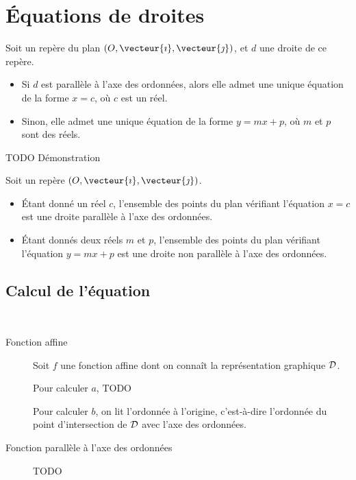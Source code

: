 \section{Équations de droites}

\begin{propriete}
  Soit un repère du plan $(O, \vecteur{\imath}, \vecteur{\jmath})$, et $d$
  une droite de ce repère.

  \begin{itemize}
    \item Si $d$ est parallèle à l'axe des ordonnées, alors elle admet une
      unique équation de la forme $x=c$, où $c$ est un réel.
    \item Sinon, elle admet une unique équation de la forme $y=mx+p$, où $m$ et
      $p$ sont des réels.
  \end{itemize}
\end{propriete}
TODO Démonstration

\begin{propriete}[Réciproque]
  Soit un repère $(O, \vecteur{\imath}, \vecteur{\jmath})$.
  \begin{itemize}
    \item Étant donné un réel $c$, l'ensemble des points du plan
      vérifiant l'équation $x=c$ est une droite parallèle à l'axe des
      ordonnées.
    \item Étant donnés deux réels $m$ et $p$, l'ensemble des points du plan
      vérifiant l'équation $y=mx+p$ est une droite non parallèle à l'axe des
      ordonnées.
  \end{itemize}
\end{propriete}

\subsection{Calcul de l'équation}

\begin{methode}~
  \begin{description}
    \item[Fonction affine] Soit $f$ une fonction affine dont on connaît la représentation graphique $\cal D$.

      Pour calculer $a$, TODO

      Pour calculer $b$, on lit l'ordonnée à l'origine, c'est-à-dire l'ordonnée
      du point d'intersection de $\cal D$ avec l'axe des ordonnées.
    \item[Fonction parallèle à l'axe des ordonnées] TODO
  \end{description}
\end{methode}


